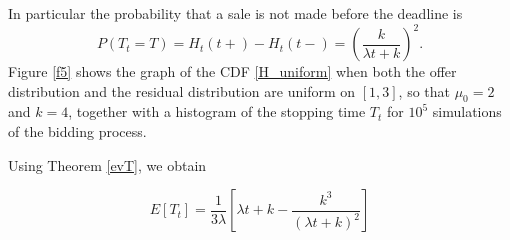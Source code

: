 \documentclass{article}
\numberwithin{equation}{section}
\begin{document}
In particular the probability that a sale is not made before the deadline is
$$P(T_t=T)=H_t(t+)-H_t(t-)=\left(\frac{k}{\lambda t+k}\right)^2.$$
Figure \ref{f5} shows the graph of 
the CDF \eqref{H_uniform} 
when both the offer distribution and the residual distribution are uniform on $[1,3]$, so that $\mu_0=2$ and $k=4$, together with a histogram of the stopping time $T_t$ for $10^5$ simulations of the bidding process. 

Using Theorem \ref{evT}, we obtain

$$E[T_t]= \frac{1}{3\lambda }
\left[\lambda t+k - \frac{k^3}{\left(\lambda t+k\right)^2} \right]$$
\end{document}

